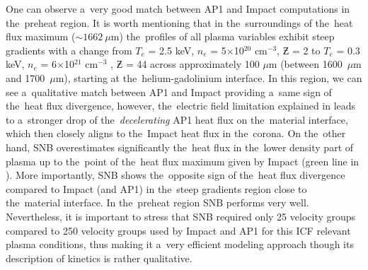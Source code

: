 One can observe a~very good
match between AP1 and Impact computations in the~preheat region.
It is worth mentioning that in the~surroundings of the~heat flux maximum 
($\sim 1662~\mu$m) the~profiles of all plasma variables 
exhibit steep gradients 
with a change from $T_e$ = 2.5 keV, $n_e$ = 5$\times$10$^{20}$ cm$^{−3}$, 
$\Zbar$ = 2 to $T_e$ = 0.3 keV, $n_e$ = 6$\times$10$^{21}$ cm$^{−3}$ , 
$\Zbar$ = 44 across approximately 100 $\mu$m 
(between 1600~$\mu$m and 1700~$\mu$m), starting at the~helium-gadolinium 
interface.  
In this region, we can see a~qualitative match between AP1 and Impact 
providing a~same sign of the~heat flux divergence, however,
the~electric field limitation explained in 
 leads to a~stronger drop of 
the~\textit{decelerating} AP1 heat flux on the~material 
interface, which then closely aligns to the~Impact heat flux in the~corona. 
On the~other hand, 
SNB overestimates significantly the~heat flux in the~lower density part 
of plasma up to the~point of the~heat flux maximum given by Impact 
(green line in ). More 
importantly, SNB shows the~opposite sign of the~heat flux divergence compared to Impact
(and AP1) in the~steep gradients region close to the~material interface. 
In the~preheat region SNB performs 
very well. Nevertheless, it is important to stress that 
SNB required only 25 velocity groups compared to 250 velocity groups used by
Impact and AP1 for this ICF relevant plasma conditions, thus making it a~very
efficient modeling approach though its description of kinetics is rather
qualitative.

%
